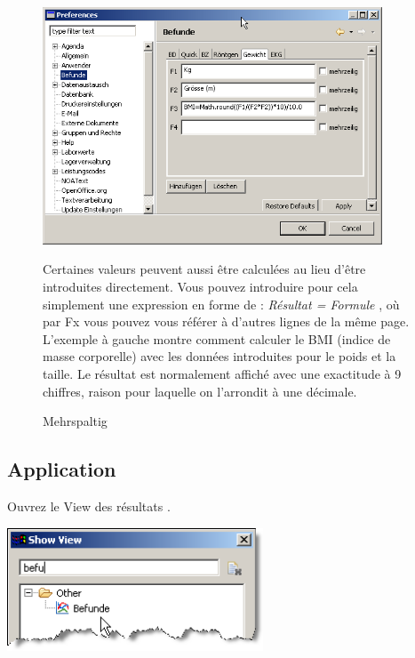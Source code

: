 \begin{figure}[htbp]
   \begin{minipage}{0.35\textwidth}
       \centering
    \includegraphics[width=0.9\textwidth]{images/befunde7.png}
    \caption{Mehrspaltig}\label{fig:befunde4}
       \label{fig:befunde4}
     \end{minipage}\hfill
     \begin{minipage}{0.65\textwidth}
Certaines valeurs peuvent aussi être calculées au lieu d'être introduites directement. Vous pouvez introduire pour cela simplement une expression en forme de :  \textit{Résultat = Formule }, où par Fx vous pouvez vous référer à d'autres lignes de la même page. L'exemple à gauche montre comment calculer le BMI (indice de masse corporelle) avec les données introduites pour le poids et la taille. Le résultat est normalement affiché avec une exactitude à 9 chiffres, raison pour laquelle on l'arrondit à une décimale.
    \end{minipage}
\end{figure}

\clearpage

\subsection{Application}
Ouvrez le View des résultats .
\begin{flushleft}
\includegraphics[width=3in]{images/befunde4.png}
\end{flushleft}

